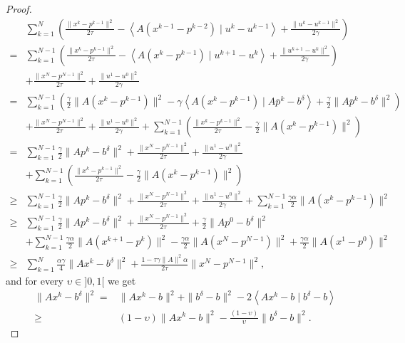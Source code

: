 \documentclass[11pt]{report}
\newcommand{\scal}[2]{{\left\langle{{#1}\mid{#2}}\right\rangle}}
\theoremstyle{plain}{\theorembodyfont{\rmfamily}%
\newtheorem{assumption}[theorem]{Assumption}}
\theoremstyle{plain}{\theorembodyfont{\rmfamily}%
\newtheorem{algorithm}[theorem]{Algorithm}}
\theoremstyle{plain}{\theorembodyfont{\rmfamily}%
\newtheorem{example}[theorem]{Example}}
\theoremstyle{plain}{\theorembodyfont{\rmfamily}%
\newtheorem{remark}[theorem]{Remark}}
\theoremstyle{plain}{\theorembodyfont{\rmfamily}%
\newtheorem{definition}[theorem]{Definition}}
\theoremstyle{plain}{\theorembodyfont{\rmfamily}%
\newtheorem{problem}[theorem]{Problem}}
\numberwithin{equation}{chapter}
\newcommand{\dal}{u}
\newcommand{\prim}{x}
\newcommand{\proj}{p}
\begin{document}
\begin{proof}
\begin{align}
   &\sum_{k=1}^{N}\left(\frac{\|\prim^{k}-\proj^{k-1}\|^2}{2\tau}-\scal{A(\prim^{k-1}-\proj^{k-2})}{\dal^{k}-\dal^{k-1}}+\frac{\|\dal^{k}-\dal^{k-1}\|^2}{2\gamma}\right)   \nonumber\\ =&  \sum_{k=1}^{N-1}\left(\frac{\|\prim^{k}-\proj^{k-1}\|^2}{2\tau}-\scal{A(\prim^{k}-\proj^{k-1})}{\dal^{k+1}-\dal^{k}}+\frac{\|\dal^{k+1}-\dal^{k}\|^2}{2\gamma}\right)\nonumber\\&+ \frac{\|\prim^{N}-\proj^{N-1}\|^2}{2\tau}+\frac{\|\dal^{1}-\dal^{0}\|^2}{2\gamma}\nonumber\\=&  \sum_{k=1}^{N-1}\left(\frac{\gamma}{2}\|A(\prim^{k}-\proj^{k-1})\|^2-\gamma\scal{A(\prim^{k}-\proj^{k-1})}{A\bar{\proj}^k-b^{\delta}}+\frac{\gamma}{2}\|A\bar{\proj}^k-b^{\delta}\|^2\right)\nonumber\\&+ \frac{\|\prim^{N}-\proj^{N-1}\|^2}{2\tau}+\frac{\|\dal^{1}-\dal^{0}\|^2}{2\gamma}+\sum_{k=1}^{N-1}\left(\frac{\|\prim^{k}-\proj^{k-1}\|^2}{2\tau}-\frac{\gamma}{2}\|A(\prim^{k}-\proj^{k-1})\|^2\right)\nonumber\\=&  \sum_{k=1}^{N-1}\frac{\gamma}{2}\|A\proj^k-b^{\delta}\|^2+ \frac{\|\prim^{N}-\proj^{N-1}\|^2}{2\tau}+\frac{\|\dal^{1}-\dal^{0}\|^2}{2\gamma}\nonumber\\&+\sum_{k=1}^{N-1}\left(\frac{\|\prim^{k}-\proj^{k-1}\|^2}{2\tau}-\frac{\gamma}{2}\|A(\prim^{k}-\proj^{k-1})\|^2\right)\nonumber\\\geq&  \sum_{k=1}^{N-1}\frac{\gamma}{2}\|A\proj^k-b^{\delta}\|^2+ \frac{\|\prim^{N}-\proj^{N-1}\|^2}{2\tau}+\frac{\|\dal^{1}-\dal^{0}\|^2}{2\gamma}+\sum_{k=1}^{N-1}\frac{\gamma\alpha}{2}\|A(\prim^{k}-\proj^{k-1})\|^2\nonumber\\\geq&  \sum_{k=1}^{N-1}\frac{\gamma}{2}\|A\proj^k-b^{\delta}\|^2+ \frac{\|\prim^{N}-\proj^{N-1}\|^2}{2\tau}+\frac{\gamma}{2}\|A\proj^0-b^{\delta}\|^2\nonumber\\&+\sum_{k=1}^{N-1}\frac{\gamma\alpha}{2}\|A(\prim^{k+1}-\proj^{k})\|^2-\frac{\gamma\alpha}{2}\|A(\prim^{N}-\proj^{N-1})\|^2+\frac{\gamma\alpha}{2}\|A(\prim^{1}-\proj^{0})\|^2\nonumber\\\geq&  \sum_{k=1}^{N}\frac{\alpha\gamma}{4}\|A\prim^{k}-b^{\delta}\|^2+\frac{1-\tau\gamma\|A\|^2\alpha}{2\tau}\|\prim^{N}-\proj^{N-1}\|^2,
    \end{align}
and for every $\upsilon\in ]0,1[$ we get
    \begin{align}
      \|A\prim^k-b^\delta\|^2 =&\|A\prim^k-b\|^2+\|b^{\delta}-b\|^2-2\scal{A\prim^k-b}{b^{\delta}-b}\nonumber\\\geq&(1-\upsilon)\|A\prim^k-b\|^2-\frac{(1-\upsilon)}{\upsilon}\|b^\delta-b\|^2.

\end{align}
\end{proof}
\end{document}
